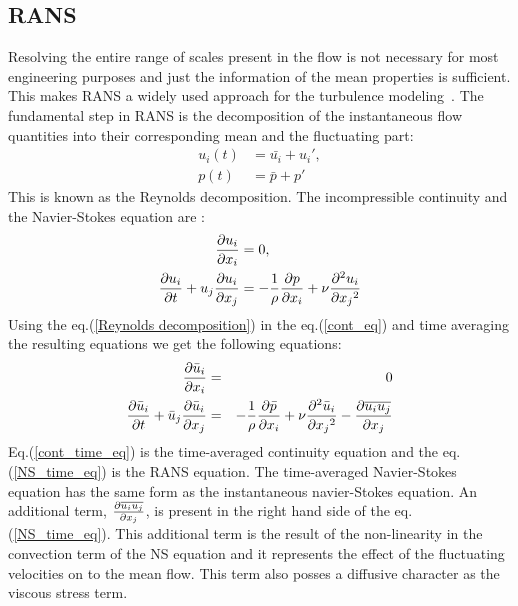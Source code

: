 \subsection{RANS}
Resolving the entire range of scales present in the flow is not necessary for most engineering purposes and just the information of the mean properties is sufficient. This makes RANS a widely used approach for the turbulence modeling~\cite{versteeg:book}. The fundamental step in RANS is the decomposition of the instantaneous flow quantities into their corresponding mean and the fluctuating part:
%
\begin{equation}
\begin{split}
u_i(t) &= \bar{u_i} + {u_i}',\\
p(t) &= \bar{p} + {p'}
\label{Reynolds decomposition}
\end{split}
\end{equation}
%
This is known as the Reynolds decomposition. 
The incompressible continuity and the Navier-Stokes equation are :
%
\begin{equation}
\label{cont_eq}
\begin{split}
\frac{\partial u_i}{\partial x_i} &= 0,\\
\frac{\partial u_{i}}{\partial t} + u_j\frac{\partial u_i}{\partial x_j} &= - \frac{1}{\rho}\frac{\partial p}{\partial x_i} + \nu \frac{\partial^2 u_i}{\partial {x_j}^2}
\end{split}
\end{equation}
%
Using the eq.(\ref{Reynolds decomposition}) in the eq.(\ref{cont_eq}) and time averaging the resulting equations we get the following equations:
%
\begin{eqnarray}
\label{cont_time_eq}
\frac{\partial  \bar{u}_i}{\partial x_i} &=& 0\\
\label{NS_time_eq}
\frac{\partial \bar{u}_{i}}{\partial t} +  \bar{u}_j\frac{\partial \bar{u}_i}{\partial x_j} &=&
-\frac{1}{\rho } \frac{\partial \bar{p}}{\partial x_i} + \nu \frac{\partial^2 \bar{u}_i}{\partial{x_j}^2} -  \frac{\partial\overline{u_iu_j}}{\partial x_j}
\end{eqnarray}
%
Eq.(\ref{cont_time_eq}) is the time-averaged continuity equation and the eq.(\ref{NS_time_eq}) is the RANS equation. The time-averaged Navier-Stokes equation has the same form as the instantaneous navier-Stokes equation. An additional term, $\frac{\partial\overline{u_iu_j}}{\partial x_j}$, is present in the right hand side of the eq.(\ref{NS_time_eq}). This additional term is the result of the non-linearity in the convection term of the NS equation and it represents the effect of the fluctuating velocities on to the mean flow. This term also posses a diffusive character as the viscous stress term.
